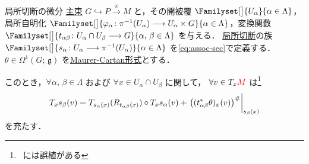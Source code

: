 \documentclass[TQFT_main]{subfiles}
\begin{document}
\begin{mylem}[label=lem:differential-of-local-section]{局所切断の微分}
    \hyperref[def.PFD]{主束} $G \hookrightarrow P \xrightarrow{\pi} M$ と，その開被覆 $\Familyset[\big]{U_\alpha}{\alpha \in \Lambda}$，局所自明化 $\Familyset[\big]{\varphi_\alpha \colon \pi^{-1}(U_\alpha) \lto U_\alpha \times G}{\alpha \in \Lambda}$，変換関数 $\Familyset[\big]{t_{\alpha\beta} \colon U_\alpha \cap U_\beta \lto G}{\alpha,\, \beta \in \Lambda}$ を与える．
    \hyperref[def.section]{局所切断}の族 $\Familyset[\big]{s_\alpha \colon U_\alpha \lto \pi^{-1}(U_\alpha)}{\alpha \in \Lambda}$ を\eqref{eq:assoc-sec}で定義する． 
    $\theta \in \Omega^1(G;\, \mathfrak{g})$ を\hyperref[def:Maurer-Cartan]{Maurer-Cartan形式}とする．

    このとき，$\forall \alpha,\, \beta \in \Lambda$ および $\forall x \in U_\alpha \cap U_\beta$ に関して，
    $\forall v \in T_x \textcolor{red}{M}$ は\footnote{~\cite[p.36, 補題10.1]{Nakahara2018topo2}には誤植がある}
    \begin{align}
        T_x s_\beta (v) = T_{s_\alpha(x)}(R_{t_{\alpha\beta}(x)}) \circ T_x s_\alpha (v) + \eval{\bigl((t_{\alpha\beta}^*\theta)_x(v)\bigr)^\#}_{s_\beta(x)}
    \end{align}
    を充たす．
\end{mylem}
\end{document}
